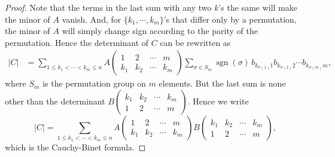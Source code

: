 \documentclass[12pt]{article}
\def\sgn{\operatorname{sgn}}
\begin{document}
\begin{proof}
Note that the terms in the last sum with any two $k$'s the same will
make the minor of $A$ vanish. And, for $\{k_1,\cdots,k_m\}$'s
that differ only by a permutation, the minor of $A$ will simply change
sign according to the parity of the permutation. Hence the determinant of
$C$ can be rewritten as
\begin{align*}
  |C| &= \sum_{1\le k_1<\cdots<k_m\le n}
    A \begin{pmatrix} 1 & 2 & \cdots & m \\ k_1 & k_2 & \cdots
      & k_m \end{pmatrix}
    \sum_{\sigma\in S_m} \sgn(\sigma)\, b_{k_{\sigma(1)} 1}
      b_{k_{\sigma(2)} 2} \cdots b_{k_{\sigma(m)} m},
\end{align*}
where $S_m$ is the permutation group on $m$ elements.
But the last sum is none other than the determinant
$B \left(\begin{smallmatrix}
  k_1 & k_2 & \cdots & k_m \\
  1 & 2 & \cdots & m
\end{smallmatrix}\right)$.
Hence we write
\begin{equation*}
  |C| = \sum_{1\le k_1<\cdots<k_m\le n}
    A \begin{pmatrix} 1 & 2 & \cdots & m \\ k_1 & k_2 & \cdots
      & k_m \end{pmatrix}
    B \begin{pmatrix} k_1 & k_2 & \cdots & k_m \\
      1 & 2 & \cdots & m\end{pmatrix},
\end{equation*}
which is the Cauchy-Binet formula.
\end{proof}
\end{document}
